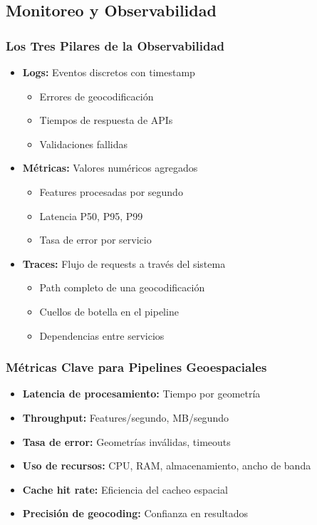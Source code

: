 \documentclass[11pt,a4paper]{article}
\begin{document}
\subsection{Monitoreo y Observabilidad}

\subsubsection{Los Tres Pilares de la Observabilidad}
\begin{itemize}
    \item \textbf{Logs:} Eventos discretos con timestamp
    \begin{itemize}
        \item Errores de geocodificación
        \item Tiempos de respuesta de APIs
        \item Validaciones fallidas
    \end{itemize}
    \item \textbf{Métricas:} Valores numéricos agregados
    \begin{itemize}
        \item Features procesadas por segundo
        \item Latencia P50, P95, P99
        \item Tasa de error por servicio
    \end{itemize}
    \item \textbf{Traces:} Flujo de requests a través del sistema
    \begin{itemize}
        \item Path completo de una geocodificación
        \item Cuellos de botella en el pipeline
        \item Dependencias entre servicios
    \end{itemize}
\end{itemize}

\subsubsection{Métricas Clave para Pipelines Geoespaciales}
\begin{itemize}
    \item \textbf{Latencia de procesamiento:} Tiempo por geometría
    \item \textbf{Throughput:} Features/segundo, MB/segundo
    \item \textbf{Tasa de error:} Geometrías inválidas, timeouts
    \item \textbf{Uso de recursos:} CPU, RAM, almacenamiento, ancho de banda
    \item \textbf{Cache hit rate:} Eficiencia del cacheo espacial
    \item \textbf{Precisión de geocoding:} Confianza en resultados
\end{itemize}
\end{document}
